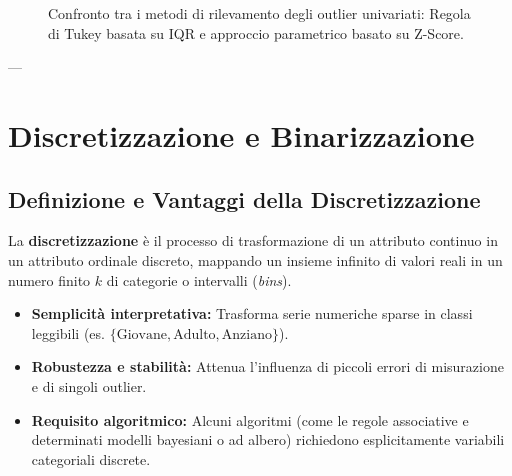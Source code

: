\begin{figure}[H]
{%
}
\caption{Confronto tra i metodi di rilevamento degli outlier univariati: Regola di Tukey basata su IQR e approccio parametrico basato su Z-Score.}
\label{fig:outlier-detection-methods}
\end{figure}

\FloatBarrier

---

\section{Discretizzazione e Binarizzazione}

\subsection{Definizione e Vantaggi della Discretizzazione}
La \textbf{discretizzazione} è il processo di trasformazione di un attributo continuo in un attributo ordinale discreto, mappando un insieme infinito di valori reali in un numero finito $k$ di categorie o intervalli (\textit{bins}).

\begin{itemize}
    \item \textbf{Semplicità interpretativa:} Trasforma serie numeriche sparse in classi leggibili (es. $\{ \text{Giovane}, \text{Adulto}, \text{Anziano} \}$).
    \item \textbf{Robustezza e stabilità:} Attenua l'influenza di piccoli errori di misurazione e di singoli outlier.
    \item \textbf{Requisito algoritmico:} Alcuni algoritmi (come le regole associative e determinati modelli bayesiani o ad albero) richiedono esplicitamente variabili categoriali discrete.
\end{itemize}

